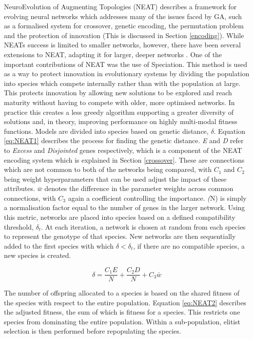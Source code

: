 \documentclass{article}
\begin{document}
		NeuroEvolution of Augmenting Topologies (NEAT) \cite{24} describes a framework for evolving neural networks which addresses many of the issues faced by GA, such as a formalised system for crossover, genetic encoding, the permutation problem and the protection of innovation (This is discussed in Section \ref{encoding}). While NEATs success is limited to smaller networks, however, there have been several extensions to NEAT, adapting it for larger, deeper networks \cite{44}\cite{25}.
		One of the important contributions of NEAT was the use of Speciation. This method is used as a way to protect innovation in evolutionary systems by dividing the population into species which compete internally rather than with the population at large. This protects innovation by allowing new solutions to be explored and reach maturity without having to compete with older, more optimised networks. In practice this creates a less greedy algorithm supporting a greater diversity of solutions and, in theory, improving performance on highly multi-modal fitness functions. 
		Models are divided into species based on genetic distance, \(\delta\). Equation \ref{eq:NEAT1} describes the process for finding the genetic distance. \textit{E} and \textit{D} refer to \textit{Excess} and \textit{Disjointed} genes respectively, which is a component of the NEAT encoding system which is explained in Section \ref{crossover}. These are connections which are not common to both of the networks being compared, with \(C_1\) and \(C_2\) being weight hyperparameters that can be used adjust the impact of these attributes. \(\bar{w}\) denotes the difference in the parameter weights across common connections, with \(C_3\) again a coefficient controlling the importance. \textit(N) is simply a normalisation factor equal to the number of genes in the larger network. Using this metric, networks are placed into species based on a defined compatibility threshold, \(\delta_t\). At each iteration, a network is chosen at random from each species to represent the genotype of that species. New networks are then sequentially added to the first species with which \(\delta < \delta_t\), if there are no compatible species, a new species is created.

		\begin{equation}\label{eq:NEAT1}	\delta = \frac{C_1E}{N}+\frac{C_2D}{N}+C_3\bar{w}
		\end{equation}


		The number of offspring allocated to a species is based on the shared fitness of the species with respect to the entire population. Equation \ref{eq:NEAT2} describes the adjusted fitness, the sum of which is fitness for a species. This restricts one species from dominating the entire population. Within a sub-population, elitist selection is then performed before repopulating the species. 
\end{document}
